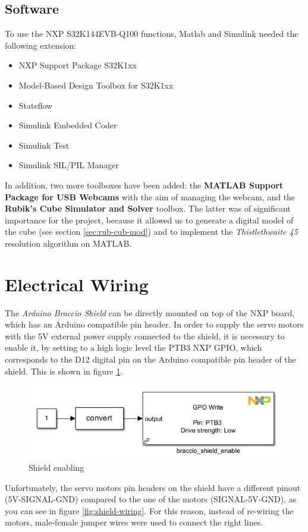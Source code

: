 \documentclass{report}
\begin{document}
\subsection{Software}
 To use the NXP S32K144EVB-Q100 functions, Matlab and Simulink needed the following extension:
\begin{itemize}
    \item NXP Support Package S32K1xx 
    \item Model-Based Design Toolbox for S32K1xx
    \item Stateflow
    \item Simulink Embedded Coder
    \item Simulink Test
    \item Simulink SIL/PIL Manager
\end{itemize}
In addition, two more toolboxes have been added: the \textbf{MATLAB Support Package for USB Webcams} with the aim of managing the webcam, and the \textbf{Rubik's Cube Simulator and Solver} toolbox. The latter was of significant importance for the project, because it allowed us to generate a digital model of the cube (see section \ref{sec:rub-cub-mod}) and to implement the \textit{Thistlethwaite 45} resolution algorithm on MATLAB.

\section{Electrical Wiring}
The \textit{Arduino Braccio Shield} can be directly mounted on top of the NXP board, which has an Arduino compatible pin header. In order to supply the servo motors with the 5V external power supply connected to the shield, it is necessary to enable it, by setting to a high logic level the PTB3 NXP GPIO, which corresponds to the D12 digital pin on the Arduino compatible pin header of the shield. This is shown in figure \ref{fig:shield-enable}.

\begin{figure}[h]
    \centering
    \includegraphics[width=0.5\linewidth]{images/Requirements/shield_enable.png}
    \caption{Shield enabling}
    \label{fig:shield-enable}
\end{figure}

Unfortunately, the servo motors pin headers on the shield have a different pinout (5V-SIGNAL-GND) compared to the one of the motors (SIGNAL-5V-GND), as you can see in figure \ref{fig:shield-wiring}. For this reason, instead of re-wiring the motors, male-female jumper wires were used to connect the right lines.
\end{document}
